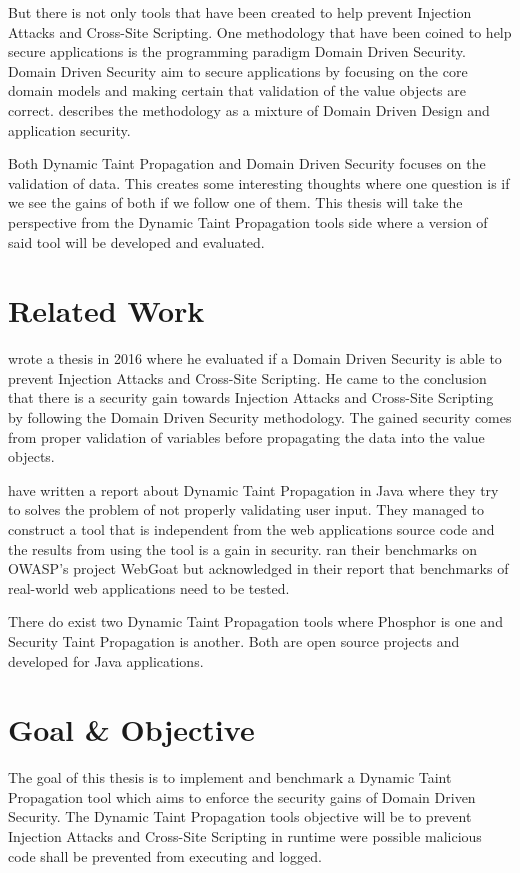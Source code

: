 \documentclass{../kththesis}
\begin{document}
But there is not only tools that have been created to help prevent Injection Attacks and Cross-Site Scripting. One methodology that have been coined to help secure applications is the programming paradigm Domain Driven Security. Domain Driven Security aim to secure applications by focusing on the core domain models and making certain that validation of the value objects are correct. \textcite{Wilander2009} describes the methodology as a mixture of Domain Driven Design and application security. \parencite{Wilander2009, Johnsson2009} 

Both Dynamic Taint Propagation and Domain Driven Security focuses on the validation of data. This creates some interesting thoughts where one question is if we see the gains of both if we follow one of them. This thesis will take the perspective from the Dynamic Taint Propagation tools side where a version of said tool will be developed and evaluated. 



\section{Related Work}
\textcite{Stendahl2016} wrote a thesis in 2016 where he evaluated if a Domain Driven Security is able to prevent Injection Attacks and Cross-Site Scripting. He came to the conclusion that there is a security gain towards Injection Attacks and Cross-Site Scripting by following the Domain Driven Security methodology. The gained security comes from proper validation of variables before propagating the data into the value objects.

\textcite{Haldar} have written a report about Dynamic Taint Propagation in Java where they try to solves the problem of not properly validating user input. They managed to construct a tool that is independent from the web applications source code and the results from using the tool is a gain in security. \textcite{Haldar} ran their benchmarks on OWASP's project WebGoat \parencite{webgoat} but acknowledged in their report that benchmarks of real-world web applications need to be tested.

There do exist two Dynamic Taint Propagation tools where Phosphor \parencite{phosphor} is one and Security Taint Propagation \parencite{securityTaint} is another. Both are open source projects and developed for Java applications.


\section{Goal \& Objective}
The goal of this thesis is to implement and benchmark a Dynamic Taint Propagation tool which aims to enforce the security gains of Domain Driven Security. The Dynamic Taint Propagation tools objective will be to prevent Injection Attacks and Cross-Site Scripting in runtime were possible malicious code shall be prevented from executing and logged.
\end{document}
